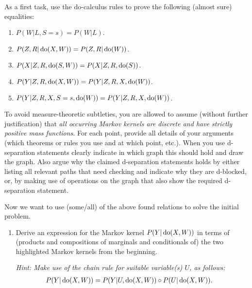 As a first task, use the do-calculus rules to prove the following (almost sure) equalities:
\begin{enumerate}[label=\alph*)]
    \item $P(W|L,S=s) = P(W|L)$.  
    \item $P(Z,R|\operatorname{do}(X,W)) = P(Z,R|\operatorname{do}(W))$.  
    \item $P(X|Z,R,\operatorname{do}(S,W)) = P(X|Z,R,\operatorname{do}(S))$.  
    \item $P(Y|Z,R,\operatorname{do}(X,W)) = P(Y|Z,R,X,\operatorname{do}(W))$.  
    \item $P(Y|Z,R,X,S=s,\operatorname{do}(W)) = P(Y|Z,R,X,\operatorname{do}(W))$.  
\end{enumerate}
To avoid measure-theoretic subtleties, you are allowed to assume (without further justification) that \emph{all occurring Markov kernels are discrete and have strictly positive mass functions}.
For each point, provide all details of your arguments (which theorems or rules you use and at which point, etc.).  
When you use d-separation statements clearly indicate in which graph this should hold and draw the graph. Also argue why the claimed d-separation statements holds by either listing all relevant paths that need checking and indicate why they are d-blocked, or, by making use of operations on the graph that also show the required d-separation statement.

Now we want to use (some/all) of the above found relations to solve the initial problem.
\begin{enumerate}[resume*]
  \item Derive an expression for the Markov kernel $P(Y|\operatorname{do}(X,W))$ in terms of (products and compositions of
    marginals and conditionals of) the two highlighted Markov kernels from the beginning.

      \emph{Hint: Make use of the chain rule for suitable variable(s) $U$, as follows: 
\begin{align}
    P(Y|\operatorname{do}(X,W)) &= P(Y|U,\operatorname{do}(X,W)) \circ P(U|\operatorname{do}(X,W)).
\end{align}
}
\end{enumerate}


